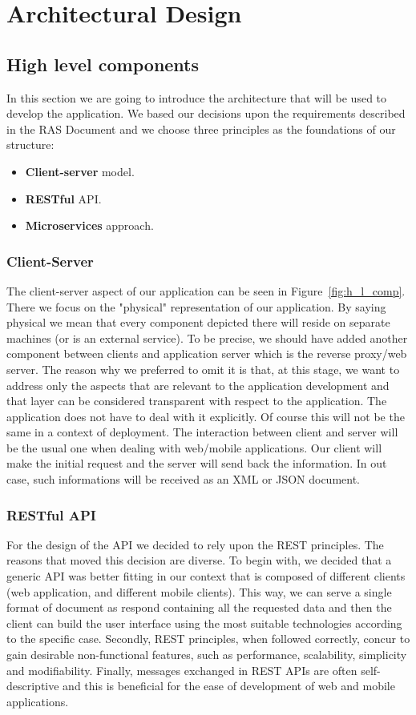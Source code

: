 \pagebreak
\section{Architectural Design}
 
\subsection{High level components}
In this section we are going to introduce the architecture that will be used to develop
the application. We based our decisions upon the requirements described in the RAS Document 
and we choose three principles as the foundations of our structure: 
\begin{itemize}
    \item \textbf{Client-server} model.
    \item \textbf{RESTful} API.
    \item \textbf{Microservices} approach.
\end{itemize}

\subsubsection{Client-Server}
The client-server aspect of our application can be seen in Figure~\ref{fig:h_l_comp}.
There we focus on the "physical" representation of our application. By saying physical we mean that
every component depicted there will reside on separate machines (or is an external service).
To be precise, we should have added another component between clients and
application server which is the reverse proxy/web server. The reason why we preferred to
omit it is that, at this stage, we want to address only the aspects that are relevant to the
application development and that layer can be considered transparent with respect to the application.
The application does not have to deal with it explicitly.
Of course this will not be the same in a context of deployment.
The interaction between client and server will be the usual one when dealing with web/mobile
applications. Our client will make the initial request and the server will send back the
information. In out case, such informations will be received as an XML or JSON document.

\subsubsection{RESTful API}
For the design of the API we decided to rely upon the REST principles. The reasons that moved
this decision are diverse. To begin with, we decided that a generic API was better fitting
in our context that is composed of different clients (web application, and different mobile
clients). This way, we can serve a single format of document as respond containing all the 
requested data and then the client can build the user interface using the most suitable
technologies according to the specific case.
Secondly, REST principles, when followed correctly, concur to gain desirable non-functional
features, such as performance, scalability, simplicity and modifiability.
Finally, messages exchanged in REST APIs are often self-descriptive and this is beneficial
for the ease of development of web and mobile applications.

